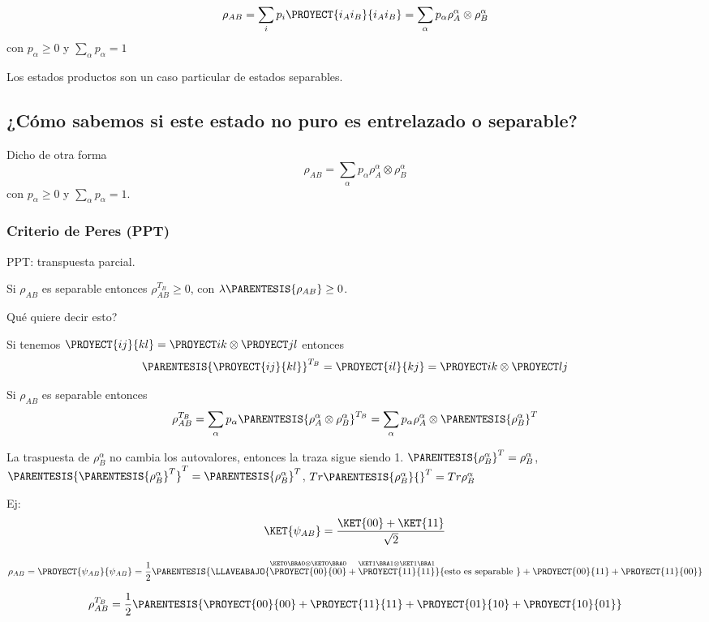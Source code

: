 \[
\rho_{AB}=\sum_{i}p_{i}\PROYECT{i_{A}i_{B}}{i_{A}i_{B}}=\sum_{\alpha}p_{\alpha}\rho_{A}^{\alpha}\otimes\rho_{B}^{\alpha}
\]
con $p_{\alpha}\geq0$ y $\sum_{\alpha}p_{\alpha}=1$

Los estados productos son un caso particular de estados separables.

\subsection{¿Cómo sabemos si este estado no puro es entrelazado o separable?}

Dicho de otra forma
\[
\rho_{AB}=\sum_{\alpha}p_{\alpha}\rho_{A}^{\alpha}\otimes\rho_{B}^{\alpha}
\]
con $p_{\alpha}\geq0$ y $\sum_{\alpha}p_{\alpha}=1$.

\subsubsection{Criterio de Peres (PPT)}

PPT: transpuesta parcial.

Si $\rho_{AB}$ es separable entonces $\rho_{AB}^{T_{B}}\geq0$, con
$\lambda\PARENTESIS{\rho_{AB}}\geq0$.

Qué quiere decir esto?

Si tenemos $\PROYECT{ij}{kl}=\PROYECT ik\otimes\PROYECT jl$ entonces
\[
\PARENTESIS{\PROYECT{ij}{kl}}^{T_{B}}=\PROYECT{il}{kj}=\PROYECT ik\otimes\PROYECT lj
\]

Si $\rho_{AB}$ es separable entonces 
\[
\rho_{AB}^{T_{B}}=\sum_{\alpha}p_{\alpha}\PARENTESIS{\rho_{A}^{\alpha}\otimes\rho_{B}^{\alpha}}^{T_{B}}=\sum_{\alpha}p_{\alpha}\rho_{A}^{\alpha}\otimes\PARENTESIS{\rho_{B}^{\alpha}}^{T}
\]

La traspuesta de $\rho_{B}^{\alpha}$ no cambia los autovalores, entonces
la traza sigue siendo 1. $\PARENTESIS{\rho_{B}^{\alpha}}^{T}=\rho_{B}^{\alpha}$,
$\PARENTESIS{\PARENTESIS{\rho_{B}^{\alpha}}^{T}}^{T}=\PARENTESIS{\rho_{B}^{\alpha}}^{T}$,
$Tr\PARENTESIS{\rho_{B}^{\alpha}}{}^{T}=Tr\rho_{B}^{\alpha}$

Ej: 
\[
\KET{\psi_{AB}}=\frac{\KET{00}+\KET{11}}{\sqrt{2}}
\]

\[
\rho_{AB}=\PROYECT{\psi_{AB}}{\psi_{AB}}=\frac{1}{2}\PARENTESIS{\LLAVEABAJO{\overset{}{\overset{\KET 0\BRA 0\otimes\KET 0\BRA 0}{\PROYECT{00}{00}}+\overset{\KET 1\BRA 1\otimes\KET 1\BRA 1}{\PROYECT{11}{11}}}}{\text{esto es separable }}+\PROYECT{00}{11}+\PROYECT{11}{00}}
\]

\[
\rho_{AB}^{T_{B}}=\frac{1}{2}\PARENTESIS{\PROYECT{00}{00}+\PROYECT{11}{11}+\PROYECT{01}{10}+\PROYECT{10}{01}}
\]

